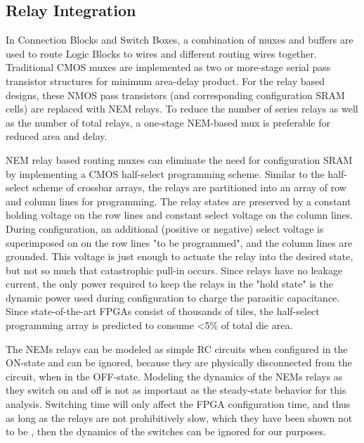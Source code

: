 \documentclass[twoside,twocolumn]{article}
\begin{document}

\subsection{Relay Integration}
In Connection Blocks and Switch Boxes, a combination of muxes and buffers are used to route Logic Blocks to wires and different routing wires together. Traditional CMOS muxes are implemented as two or more-stage serial pass transistor structures for minimum area-delay product. For the relay based designs, these NMOS pass transistors (and corresponding configuration SRAM cells) are replaced with NEM relays. To reduce the number of series relays as well as the number of total relays, a one-stage NEM-based mux is preferable for reduced area and delay\cite{chen_efficient_2010}.

NEM relay based routing muxes can eliminate the need for configuration SRAM by implementing a CMOS half-select programming scheme\cite{chen_efficient_2010}. Similar to the half-select scheme of crossbar arrays, the relays are partitioned into an array of row and column lines for programming. The relay states are preserved by a constant holding voltage on the row lines and constant select voltage on the column lines. During configuration, an additional (positive or negative) select voltage is superimposed on on the row lines "to be programmed", and the column lines are grounded. This voltage is just enough to actuate the relay into the desired state, but not so much that catastrophic pull-in occurs. Since relays have no leakage current, the only power required to keep the relays in the "hold state" is the dynamic power used during configuration to charge the parasitic capacitance. Since state-of-the-art FPGAs consist of thousands of tiles, the half-select programming array is predicted to consume <5\% of total die area.

The NEMs relays can be modeled as simple RC circuits when configured in the 
ON-state \cite{chen_efficient_2010} \cite{chen_integrated_2008} and can be ignored, 
because they are physically disconnected from the 
circuit, when in the OFF-state. Modeling the dynamics of the NEMs relays
as they switch on and off is not as important as the steady-state behavior
for this analysis. Switching time will only affect the FPGA configuration
time, and thus as long as the relays are not prohibitively slow, which they
have been shown not to be \cite{chen_integrated_2008}, then the dynamics of the switches can be 
ignored for our purposes.
\end{document}
